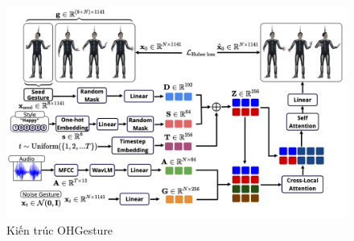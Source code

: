 %
%
%
%


\begin{figure}
	\centering
	\includegraphics[width=\linewidth]{images/architecture_diffusion}
	\caption{Kiến trúc OHGesture}
	\label{fig:architecturediffusion}
\end{figure}


